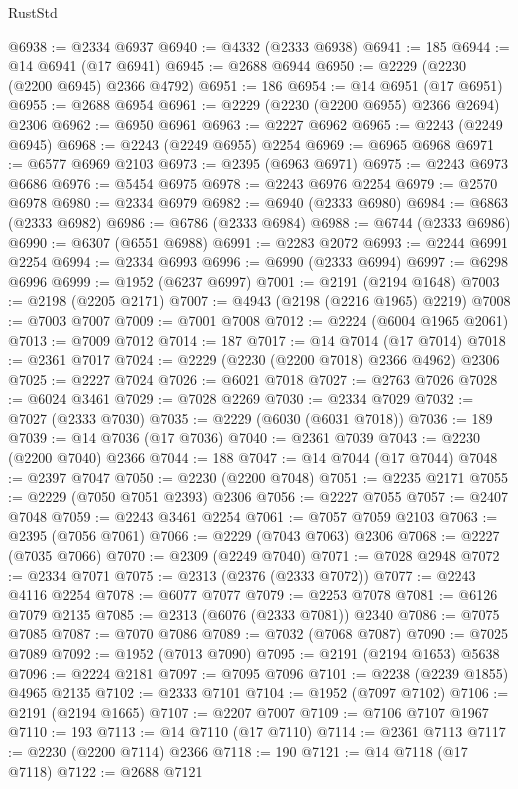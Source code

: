\begin{lexlean}{RustStd}
\begin{coremodule}
@6938 := @2334 @6937
@6940 := @4332 (@2333 @6938)
@6941 := 185
@6944 := @14 @6941 (@17 @6941)
@6945 := @2688 @6944
@6950 := @2229 (@2230 (@2200 @6945) @2366 @4792)
@6951 := 186
@6954 := @14 @6951 (@17 @6951)
@6955 := @2688 @6954
@6961 := @2229 (@2230 (@2200 @6955) @2366 @2694) @2306
@6962 := @6950 @6961
@6963 := @2227 @6962
@6965 := @2243 (@2249 @6945)
@6968 := @2243 (@2249 @6955) @2254
@6969 := @6965 @6968
@6971 := @6577 @6969 @2103
@6973 := @2395 (@6963 @6971)
@6975 := @2243 @6973 @6686
@6976 := @5454 @6975
@6978 := @2243 @6976 @2254
@6979 := @2570 @6978
@6980 := @2334 @6979
@6982 := @6940 (@2333 @6980)
@6984 := @6863 (@2333 @6982)
@6986 := @6786 (@2333 @6984)
@6988 := @6744 (@2333 @6986)
@6990 := @6307 (@6551 @6988)
@6991 := @2283 @2072
@6993 := @2244 @6991 @2254
@6994 := @2334 @6993
@6996 := @6990 (@2333 @6994)
@6997 := @6298 @6996
@6999 := @1952 (@6237 @6997)
@7001 := @2191 (@2194 @1648)
@7003 := @2198 (@2205 @2171)
@7007 := @4943 (@2198 (@2216 @1965) @2219)
@7008 := @7003 @7007
@7009 := @7001 @7008
@7012 := @2224 (@6004 @1965 @2061)
@7013 := @7009 @7012
@7014 := 187
@7017 := @14 @7014 (@17 @7014)
@7018 := @2361 @7017
@7024 := @2229 (@2230 (@2200 @7018) @2366 @4962) @2306
@7025 := @2227 @7024
@7026 := @6021 @7018
@7027 := @2763 @7026
@7028 := @6024 @3461
@7029 := @7028 @2269
@7030 := @2334 @7029
@7032 := @7027 (@2333 @7030)
@7035 := @2229 (@6030 (@6031 @7018))
@7036 := 189
@7039 := @14 @7036 (@17 @7036)
@7040 := @2361 @7039
@7043 := @2230 (@2200 @7040) @2366
@7044 := 188
@7047 := @14 @7044 (@17 @7044)
@7048 := @2397 @7047
@7050 := @2230 (@2200 @7048)
@7051 := @2235 @2171
@7055 := @2229 (@7050 @7051 @2393) @2306
@7056 := @2227 @7055
@7057 := @2407 @7048
@7059 := @2243 @3461 @2254
@7061 := @7057 @7059 @2103
@7063 := @2395 (@7056 @7061)
@7066 := @2229 (@7043 @7063) @2306
@7068 := @2227 (@7035 @7066)
@7070 := @2309 (@2249 @7040)
@7071 := @7028 @2948
@7072 := @2334 @7071
@7075 := @2313 (@2376 (@2333 @7072))
@7077 := @2243 @4116 @2254
@7078 := @6077 @7077
@7079 := @2253 @7078
@7081 := @6126 @7079 @2135
@7085 := @2313 (@6076 (@2333 @7081)) @2340
@7086 := @7075 @7085
@7087 := @7070 @7086
@7089 := @7032 (@7068 @7087)
@7090 := @7025 @7089
@7092 := @1952 (@7013 @7090)
@7095 := @2191 (@2194 @1653) @5638
@7096 := @2224 @2181
@7097 := @7095 @7096
@7101 := @2238 (@2239 @1855) @4965 @2135
@7102 := @2333 @7101
@7104 := @1952 (@7097 @7102)
@7106 := @2191 (@2194 @1665)
@7107 := @2207 @7007
@7109 := @7106 @7107 @1967
@7110 := 193
@7113 := @14 @7110 (@17 @7110)
@7114 := @2361 @7113
@7117 := @2230 (@2200 @7114) @2366
@7118 := 190
@7121 := @14 @7118 (@17 @7118)
@7122 := @2688 @7121

\end{coremodule}
\end{lexlean}
